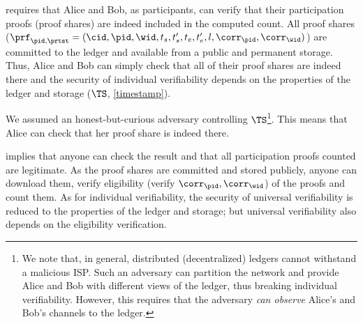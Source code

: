  requires that Alice and Bob, as participants, can verify 
that their participation proofs (\ie proof shares) are indeed included in the 
computed count.
All proof shares (\ie \(\prf_{\pid, \prtst} = (\cid, \pid, \wid, t_s, t_s', 
  t_e, t_e', l, \corr_\pid, \corr_\wid)\)) are committed to the ledger and 
available from a public and permanent storage.
Thus, Alice and Bob can simply check that all of their proof shares are indeed 
there and the security of individual verifiability depends on the properties of 
the ledger and storage (\(\TS\), \cref{timestamp}).

We assumed an honest-but-curious adversary controlling \(\TS\)\footnote{%
  We note that, in general, distributed (decentralized) ledgers cannot 
  withstand a malicious \ac{ISP}.
  Such an adversary can partition the network and provide Alice and Bob with 
  different views of the ledger, thus breaking individual verifiability.
  However, this requires that the adversary \emph{can observe} Alice's and 
  Bob's channels to the ledger.
}.
This means that Alice can check that her proof share is indeed there.

 implies that anyone can check the result and that all 
participation proofs counted are legitimate.
As the proof shares are committed and stored publicly, anyone can
download them, verify eligibility (\ie verify \(\corr_\pid,
\corr_{\wid}\)) of the proofs and count them.
As for individual verifiability, the security of universal verifiability is 
reduced to the properties of the ledger and storage; but universal 
verifiability also depends on the eligibility verification.
